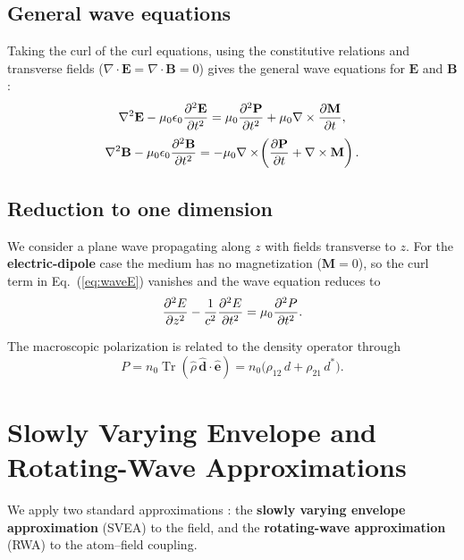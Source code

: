 \documentclass[12pt,a4paper]{article}
\begin{document}
\subsection{General wave equations}

Taking the curl of the curl equations, using the constitutive relations and
transverse fields ($\nabla\cdot\mathbf{E} = \nabla\cdot\mathbf{B} = 0$)
gives the general wave equations for $\mathbf{E}$ and $\mathbf{B}$:
\begin{equation}
  \nabla^2\mathbf{E} - \mu_0\epsilon_0\dfrac{\partial ^2\mathbf{E}}{\partial t^2}
  = \mu_0\dfrac{\partial ^2\mathbf{P}}{\partial t^2}
  + \mu_0\nabla\times\dfrac{\partial \mathbf{M}}{\partial t},
  \label{eq:waveE}
\end{equation}
\begin{equation}
  \nabla^2\mathbf{B} - \mu_0\epsilon_0\dfrac{\partial ^2\mathbf{B}}{\partial t^2}
  = -\mu_0\nabla\times\!\left(\dfrac{\partial \mathbf{P}}{\partial t}
  + \nabla\times\mathbf{M}\right).
  \label{eq:waveB}
\end{equation}

\subsection{Reduction to one dimension}

We consider a plane wave propagating along $z$ with fields transverse to $z$.
For the \textbf{electric-dipole} case the medium has no magnetization
($\mathbf{M}=0$), so the curl term in Eq.~(\ref{eq:waveE}) vanishes and
the wave equation reduces to
\begin{equation}
  \dfrac{\partial ^2 E}{\partial z^2} - \frac{1}{c^2}\dfrac{\partial ^2 E}{\partial t^2}
  = \mu_0\dfrac{\partial ^2 P}{\partial t^2}.
  \label{eq:wave1DE}
\end{equation}

The macroscopic polarization is related to the density operator through
\begin{equation}
  P = n_0\operatorname{Tr}(\hat{\rho}\,\hat{\bm{d}}\cdot\hat{\bm{e}})
    = n_0\bigl(\rho_{12}\,d + \rho_{21}\,d^*\bigr).
\end{equation}

\section{Slowly Varying Envelope and Rotating-Wave Approximations}

We apply two standard approximations \cite{GrossHaroche1982,Benedict1996}:
the \textbf{slowly varying envelope approximation} (SVEA) to the field, and
the \textbf{rotating-wave approximation} (RWA) to the atom--field coupling.
\end{document}
